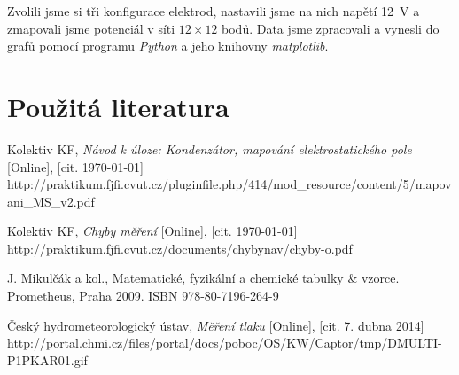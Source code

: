 \documentclass[english]{article}
\begin{document}
		Zvolili jsme si tři konfigurace elektrod, nastavili jsme na nich napětí 12~V a zmapovali jsme potenciál v síti $12\times12$ bodů. Data jsme zpracovali a vynesli do grafů pomocí programu \emph{Python} a jeho knihovny \emph{matplotlib}. 

\section {Použitá literatura}
\begingroup
\renewcommand{\section}[2]{}

\begin{thebibliography}{9}
 Kolektiv KF, \emph{Návod k úloze: Kondenzátor, mapování elektrostatického pole} [Online], [cit. \today] \newline http://praktikum.fjfi.cvut.cz/pluginfile.php/414/mod\_resource/content/5/mapovani\_MS\_v2.pdf



 Kolektiv KF, \emph{Chyby měření} [Online], [cit. \today] \newline http://praktikum.fjfi.cvut.cz/documents/chybynav/chyby-o.pdf


 J. Mikulčák a kol., Matematické, fyzikální a chemické tabulky \& vzorce. Prometheus,
Praha 2009.\newline
ISBN 978-80-7196-264-9

 Český hydrometeorologický ústav, \emph{Měření tlaku} [Online], [cit. 7. dubna 2014] \newline http://portal.chmi.cz/files/portal/docs/poboc/OS/KW/Captor/tmp/DMULTI-P1PKAR01.gif


\end{thebibliography}
\endgroup
\setcounter{equation}{0}
\clearpage
\end{document}
